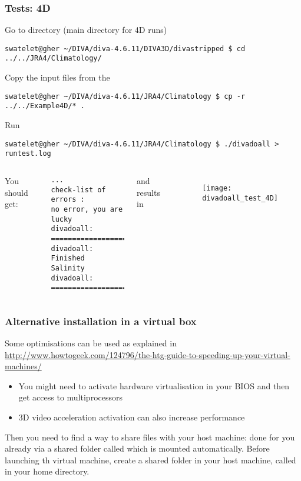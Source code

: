 \begin{frame}[fragile]
\frametitle{Tests: 4D}
\footnotesize
Go to directory  (main directory for 4D runs)
\begin{lstlisting}[style=Bash]
swatelet@gher ~/DIVA/diva-4.6.11/DIVA3D/divastripped $ cd ../../JRA4/Climatology/
\end{lstlisting}
Copy the input files from the 
\begin{lstlisting}[style=Bash]
swatelet@gher ~/DIVA/diva-4.6.11/JRA4/Climatology $ cp -r ../../Example4D/* .
\end{lstlisting}
Run  \Coffeecup\Coffeecup
\begin{lstlisting}[style=Bash]
swatelet@gher ~/DIVA/diva-4.6.11/JRA4/Climatology $ ./divadoall > runtest.log
\end{lstlisting}

\begin{columns}[totalwidth=\textwidth]
You should get:
{\tiny
\begin{verbatim}
...
check-list of errors :
no error, you are lucky
divadoall: ==================
divadoall: Finished  Salinity
divadoall: ==================

\end{verbatim}
and results in 
}

\begin{figure}
\texttt{[image: divadoall\_test\_4D]}
\end{figure}
\end{columns}

\end{frame}

\begin{frame}
\frametitle{Alternative installation in a virtual box}

Some optimisations can be used as explained in \url{http://www.howtogeek.com/124796/the-htg-guide-to-speeding-up-your-virtual-machines/}

\begin{itemize}
\item You might need to activate hardware virtualisation in your BIOS and then get access to multiprocessors
\item 3D video acceleration activation can also increase performance
\end{itemize}

Then you need to find a way to share files with your host machine: done for you already via
a shared folder called  which is mounted automatically. Before launching th virtual machine, create a shared folder in your host machine, called  in your home directory.


\end{frame}



